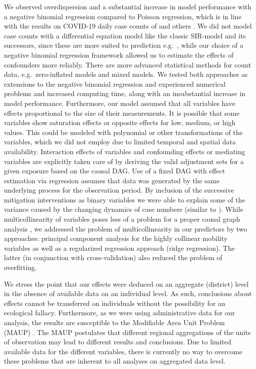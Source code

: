 \documentclass[10pt,letterpaper]{article}
\begin{document}
We observed overdispersion and a substantial increase in model performance with a negative binomial regression compared to Poisson regression, which is in line with the results on COVID-19 daily case counts of \cite{kraemer_effect_2020} and others \cite{liu_impact_2020, bannister-tyrrell_preliminary_2020, Islamm2743}. We did not model case counts with a differential equation model like the classic SIR-model \cite{kermack1991contributions} and its successors, since these are more suited to prediction e.g.~\cite{rkimodellierung}, while our choice of a negative binomial regression framework allowed us to estimate the effects of confounders more reliably. There are more advanced statistical methods for count data, e.g.~zero-inflated models and mixed models. We tested both approaches as extensions to the negative binomial regression and experienced numerical problems and increased computing time, along with an insubstantial increase in model performance. Furthermore, our model assumed that all variables have effects proportional to the size of their measurements. It is possible that some variables show saturation effects or opposite effects for low, medium, or high values. This could be modeled with polynomial or other transformations of the variables, which we did not employ due to limited temporal and spatial data availability. Interaction effects of variables and confounding effects or mediating variables are explicitly taken care of by deriving the valid adjustment sets for a given exposure based on the causal DAG. Use of a fixed DAG with effect estimation via regression assumes that data was generated by the same underlying process for the observation period. By inclusion of the successive mitigation interventions as binary variables we were able to explain some of the variance caused by the changing dynamics of case numbers (similar to \cite{Islamm2743}). While multicollinearity of variables poses less of a problem for a proper causal graph analysis \cite{schisterman2017collinearitycausal}, we addressed the problem of multicollinearity in our predictors by two approaches: principal component analysis for the highly collinear mobility variables as well as a regularized regression approach (ridge regression). The latter (in conjunction with cross-validation) also reduced the problem of overfitting.

We stress the point that our effects were deduced on an aggregate (district) level in the absence of available data on an individual level. As such, conclusions about effects cannot be transferred on individuals without the possibility for an ecological fallacy. Furthermore, as we were using administrative data for our analysis, the results are susceptible to the Modifiable Area Unit Problem (MAUP) \cite{Openshaw1984}. The MAUP postulates that different regional aggregations of the units of observation may lead to different results and conclusions. Due to limited available data for the different variables, there is currently no way to overcome these problems that are inherent to all analyses on aggregated data level.
\end{document}

